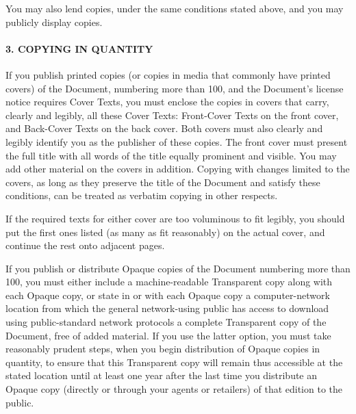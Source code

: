 \begin{multicols}{2}
{\footnotesize You may also lend copies, under the same conditions stated above, and you may publicly display copies.}{\footnotesize \par}


\paragraph{{\footnotesize 3. COPYING IN QUANTITY}\label{par:3.-COPYING-IN}}

{\footnotesize If you publish printed copies (or copies in media that commonly have printed covers) of the Document, numbering more than 100, and the Document's license notice requires Cover Texts, you must enclose the copies in covers that carry, clearly and legibly, all these Cover Texts: Front-Cover Texts on the front cover, and Back-Cover Texts on the back cover. Both covers must also clearly and legibly identify you as the publisher of these copies. The front cover must present the full title with all words of the title equally prominent and visible. You may add other material on the covers in addition.  Copying with changes limited to the covers, as long as they preserve the title of the Document and satisfy these conditions, can be treated as verbatim copying in other respects.}{\footnotesize \par}

{\footnotesize If the required texts for either cover are too voluminous to fit legibly, you should put the first ones listed (as many as fit reasonably) on the actual cover, and continue the rest onto adjacent pages.}{\footnotesize \par}

{\footnotesize If you publish or distribute Opaque copies of the Document numbering more than 100, you must either include a machine-readable Transparent copy along with each Opaque copy, or state in or with each Opaque copy a computer-network location from which the general network-using public has access to download using public-standard network protocols a complete Transparent copy of the Document, free of added material. If you use the latter option, you must take reasonably prudent steps, when you begin distribution of Opaque copies in quantity, to ensure that this Transparent copy will remain thus accessible at the stated location until at least one year after the last time you distribute an Opaque copy (directly or through your agents or retailers) of that edition to the public.}{\footnotesize \par}


\end{multicols}
